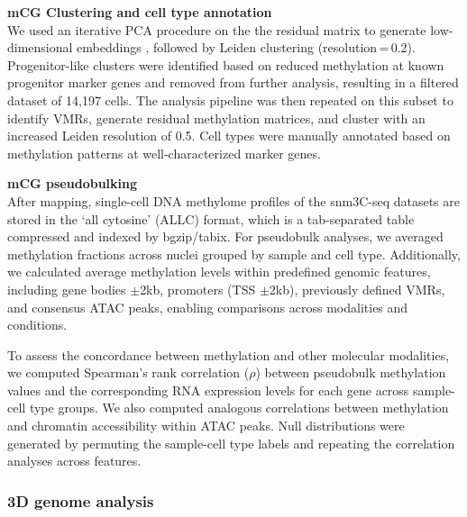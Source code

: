 \textbf{mCG Clustering and cell type annotation} \\
We used an iterative PCA procedure on the the residual matrix to generate low-dimensional embeddings \cite{Kremer2024-pd}, followed by Leiden clustering (resolution\,=\,0.2). Progenitor-like clusters were identified based on reduced methylation at known progenitor marker genes and removed from further analysis, resulting in a filtered dataset of 14{,}197 cells. The analysis pipeline was then repeated on this subset to identify VMRs, generate residual methylation matrices, and cluster with an increased Leiden resolution of 0.5. Cell types were manually annotated based on methylation patterns at well-characterized marker genes.

\textbf{mCG pseudobulking} \\
After mapping, single-cell DNA methylome profiles of the snm3C-seq datasets are stored in the `all cytosine' (ALLC) format, which is a tab-separated table compressed and indexed by bgzip/tabix. For pseudobulk analyses, we averaged methylation fractions across nuclei grouped by sample and cell type. Additionally, we calculated average methylation levels within predefined genomic features, including gene bodies $\pm$2kb, promoters (TSS $\pm$2kb), previously defined VMRs, and consensus ATAC peaks, enabling comparisons across modalities and conditions.

To assess the concordance between methylation and other molecular modalities, we computed Spearman’s rank correlation ($\rho$) between pseudobulk methylation values and the corresponding RNA expression levels for each gene across sample-cell type groups. We also computed analogous correlations between methylation and chromatin accessibility within ATAC peaks. Null distributions were generated by permuting the sample-cell type labels and repeating the correlation analyses across features.

\subsubsection{3D genome analysis}

